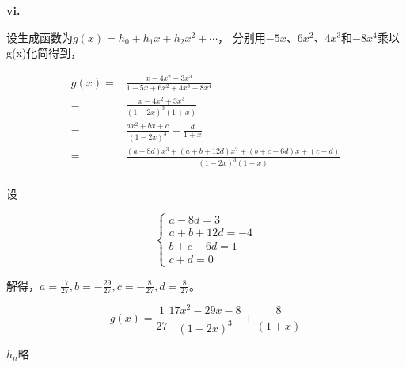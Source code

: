\documentclass[UTF8]{ctexart}
\begin{document}
    \textbf{vi. }

    设生成函数为$g(x) = h_0 + h_1 x + h_2 x^2 + \cdots$，
    分别用$-5x$、$6x^2$、$4x^3$和$-8x^4$乘以g(x)化简得到，

    \begin{equation*}
        \begin{aligned}
            g(x) =& \frac{x-4x^2+3x^3}{1-5x+6x^2+4x^3-8x^4} \\
            =& \frac{x-4x^2+3x^3}{(1-2x)^3(1+x)} \\
            =& \frac{ax^2 + bx + c}{(1-2x)^3} + \frac{d}{1+x} \\
            =& \frac{(a-8d)x^3 + (a+b+12d)x^2 + (b+c-6d)x + (c+d)}{(1-2x)^3(1+x)} \\
        \end{aligned}
    \end{equation*}

    设

    \begin{equation*}
        \begin{cases}
            a-8d = 3 \\
            a+b+12d = -4 \\
            b+c-6d = 1 \\
            c+d = 0
        \end{cases}
    \end{equation*}

    解得，$a = \frac{17}{27}, b = -\frac{29}{27}, c = -\frac{8}{27}, d = \frac{8}{27}$。

    $$g(x) = \frac{1}{27} \frac{17x^2 - 29 x - 8}{(1-2x)^3} + \frac{8}{(1+x)}$$

    $h_n$略
\end{document}
